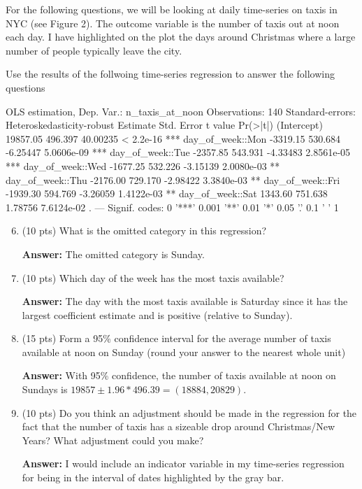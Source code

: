 \documentclass[12pt]{article}
\newcommand{\answer}[1]{{\color{blue_winged_teal}\textbf{Answer:} #1}}
\newcommand{\pts}[1]{{\color{zinc500}(#1 pts)}}
\begin{document}
\noindent For the following questions, we will be looking at daily time-series on taxis in NYC (see Figure 2). The outcome variable is the number of taxis out at noon each day. I have highlighted on the plot the days around Christmas where a large number of people typically leave the city.

Use the results of the follwoing time-series regression to answer the following questions
\begin{codeblock}[{}]
OLS estimation, Dep. Var.: n_taxis_at_noon
Observations: 140
Standard-errors: Heteroskedasticity-robust 
                  Estimate Std. Error  t value   Pr(>|t|)    
(Intercept)      19857.05    496.397 40.00235  < 2.2e-16 ***
day_of_week::Mon -3319.15    530.684 -6.25447 5.0606e-09 ***
day_of_week::Tue -2357.85    543.931 -4.33483 2.8561e-05 ***
day_of_week::Wed -1677.25    532.226 -3.15139 2.0080e-03 ** 
day_of_week::Thu -2176.00    729.170 -2.98422 3.3840e-03 ** 
day_of_week::Fri -1939.30    594.769 -3.26059 1.4122e-03 ** 
day_of_week::Sat  1343.60    751.638  1.78756 7.6124e-02 .   
---
Signif. codes:  0 '***' 0.001 '**' 0.01 '*' 0.05 '.' 0.1 ' ' 1
\end{codeblock}

\begin{enumerate}
  \setcounter{enumi}{5}
  \item \pts{10} What is the omitted category in this regression?
  
  \answer{The omitted category is Sunday.}
  
  \item \pts{10} Which day of the week has the most taxis available? 
  
  \answer{The day with the most taxis available is Saturday since it has the largest coefficient estimate and is positive (relative to Sunday).}

  \item \pts{15} Form a 95\% confidence interval for the average number of taxis available at noon on Sunday (round your answer to the nearest whole unit)
  
  \answer{With 95\% confidence, the number of taxis available at noon on Sundays is $19857 \pm 1.96 * 496.39 = (18884, 20829)$.}
    
  \item \pts{10} Do you think an adjustment should be made in the regression for the fact that the number of taxis has a sizeable drop around Christmas/New Years? What adjustment could you make?
  
  \answer{I would include an indicator variable in my time-series regression for being in the interval of dates highlighted by the gray bar.}
\end{enumerate}
\end{document}
